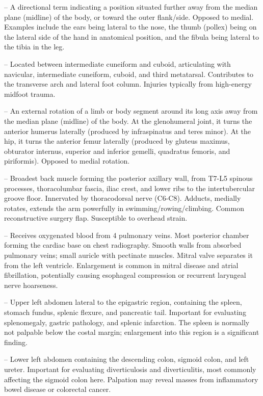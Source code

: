 -- A directional term indicating a position situated further away from the median plane (midline) of the body, or toward the outer flank/side. Opposed to medial. Examples include the ears being lateral to the nose, the thumb (pollex) being on the lateral side of the hand in anatomical position, and the fibula being lateral to the tibia in the leg.

-- Located between intermediate cuneiform and cuboid, articulating with navicular, intermediate cuneiform, cuboid, and third metatarsal. Contributes to the transverse arch and lateral foot column. Injuries typically from high-energy midfoot trauma.

-- An external rotation of a limb or body segment around its long axis away from the median plane (midline) of the body. At the glenohumeral joint, it turns the anterior humerus laterally (produced by infraspinatus and teres minor). At the hip, it turns the anterior femur laterally (produced by gluteus maximus, obturator internus, superior and inferior gemelli, quadratus femoris, and piriformis). Opposed to medial rotation.

-- Broadest back muscle forming the posterior axillary wall, from T7-L5 spinous processes, thoracolumbar fascia, iliac crest, and lower ribs to the intertubercular groove floor. Innervated by thoracodorsal nerve (C6-C8). Adducts, medially rotates, extends the arm powerfully in swimming/rowing/climbing. Common reconstructive surgery flap. Susceptible to overhead strain.

-- Receives oxygenated blood from 4 pulmonary veins. Most posterior chamber forming the cardiac base on chest radiography. Smooth walls from absorbed pulmonary veins; small auricle with pectinate muscles. Mitral valve separates it from the left ventricle. Enlargement is common in mitral disease and atrial fibrillation, potentially causing esophageal compression or recurrent laryngeal nerve hoarseness.

-- Upper left abdomen lateral to the epigastric region, containing the spleen, stomach fundus, splenic flexure, and pancreatic tail. Important for evaluating splenomegaly, gastric pathology, and splenic infarction. The spleen is normally not palpable below the costal margin; enlargement into this region is a significant finding.

-- Lower left abdomen containing the descending colon, sigmoid colon, and left ureter. Important for evaluating diverticulosis and diverticulitis, most commonly affecting the sigmoid colon here. Palpation may reveal masses from inflammatory bowel disease or colorectal cancer.

